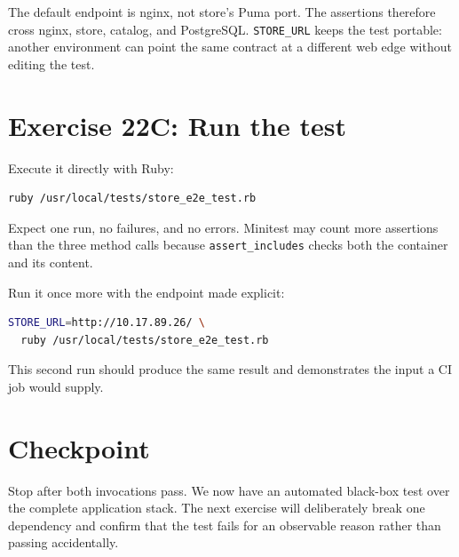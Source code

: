 The default endpoint is nginx, not store's Puma port. The assertions therefore
cross nginx, store, catalog, and PostgreSQL. \texttt{STORE\_URL} keeps the test
portable: another environment can point the same contract at a different web
edge without editing the test.

\section{Exercise 22C: Run the test}

Execute it directly with Ruby:

\begin{lstlisting}[language=sh]
ruby /usr/local/tests/store_e2e_test.rb
\end{lstlisting}

Expect one run, no failures, and no errors. Minitest may count more assertions
than the three method calls because \texttt{assert\_includes} checks both the
container and its content.

Run it once more with the endpoint made explicit:

\begin{lstlisting}[language=sh]
STORE_URL=http://10.17.89.26/ \
  ruby /usr/local/tests/store_e2e_test.rb
\end{lstlisting}

This second run should produce the same result and demonstrates the input a CI
job would supply.

\section{Checkpoint}

Stop after both invocations pass. We now have an automated black-box test over
the complete application stack. The next exercise will deliberately break one
dependency and confirm that the test fails for an observable reason rather
than passing accidentally.
